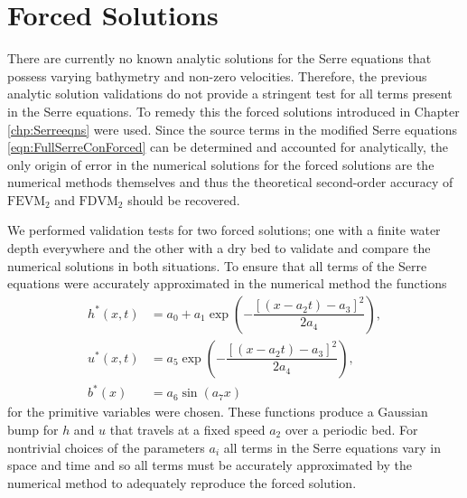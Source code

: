 
\section{Forced Solutions}
There are currently no known analytic solutions for the Serre equations that possess varying bathymetry and non-zero velocities. Therefore, the previous analytic solution validations do not provide a stringent test for all terms present in the Serre equations. To remedy this the forced solutions introduced in Chapter \ref{chp:Serreeqns} were used. Since the source terms in the modified Serre equations \eqref{eqn:FullSerreConForced} can be determined and accounted for analytically, the only origin of error in the numerical solutions for the forced solutions are the numerical methods themselves and thus the theoretical second-order accuracy of $\text{FEVM}_2$ and $\text{FDVM}_2$ should be recovered. 

We performed validation tests for two forced solutions; one with a finite water depth everywhere and the other with a dry bed to validate and compare the numerical solutions in both situations. To ensure that all terms of the Serre equations were accurately approximated in the numerical method the functions
\begin{subequations}
\begin{align}
\label{eqn:ForcedSolutionxt}
h^*(x,t) &= a_0 + a_1 \exp\left(-\dfrac{\left[\left(x - a_2 t\right) - a_3\right]^2}{2 a_4}\right), \\
u^*(x,t) &= a_5 \exp\left(-\dfrac{\left[\left(x - a_2 t\right) - a_3\right]^2}{2 a_4}\right), \\
b^*(x) &= a_6 \sin\left(a_7 x\right)
\end{align}
\end{subequations}
for the primitive variables were chosen. These functions produce a Gaussian bump for $h$ and $u$ that travels at a fixed speed $a_2$ over a periodic bed. For nontrivial choices of the parameters $a_i$ all terms in the Serre equations vary in space and time and so all terms must be accurately approximated by the numerical method to adequately reproduce the forced solution. 

